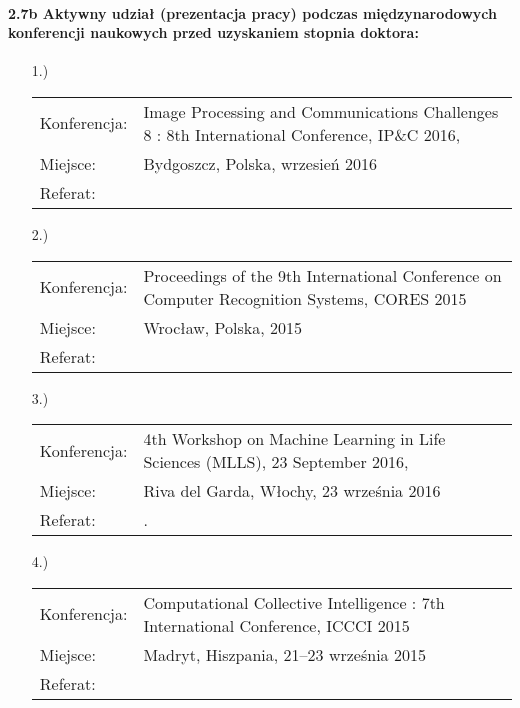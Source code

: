 \paragraph{2.7b Aktywny udział (prezentacja pracy) podczas międzynarodowych konferencji naukowych przed uzyskaniem stopnia doktora:}
\begin{itemize}
	\item[1.)]~\\
	
	\begin{tabular}{p{7em}p{32.5em}}
	Konferencja:& Image Processing and Communications Challenges 8 : 8th International Conference, IP\&C 2016, \\
	Miejsce: & Bydgoszcz, Polska, wrzesień 2016\\
	Referat: & \textbf{\fullcite{Woz16}}		
	\end{tabular}	
				
	\item[2.)]~\\
	
	\begin{tabular}{p{7em}p{32.5em}}
	Konferencja:& Proceedings of the 9th International Conference on Computer Recognition Systems, CORES 2015\\
	Miejsce: & Wrocław, Polska, 2015\\
	Referat: & \textbf{\fullcite{Ksi16a}}		
	\end{tabular}\newpage
	
	\item[3.)]~\\
	
	\begin{tabular}{p{7em}p{32.5em}}
	Konferencja:& 4th Workshop on Machine Learning in Life Sciences (MLLS), 23 September 2016,\\
	Miejsce: & Riva del Garda, Włochy, 23 września 2016\\
	Referat: & \textbf{\fullcite{Ksi16m}}.	
	\end{tabular}
	
	\item[4.)]~\\
	
	\begin{tabular}{p{7em}p{32.5em}}
	Konferencja:& Computational Collective Intelligence : 7th International Conference, ICCCI 2015\\
	Miejsce: & Madryt, Hiszpania, 21–23 września 2015\\
	Referat: & \textbf{\fullcite{Ksi15a}}		
	\end{tabular}		


\end{itemize}
